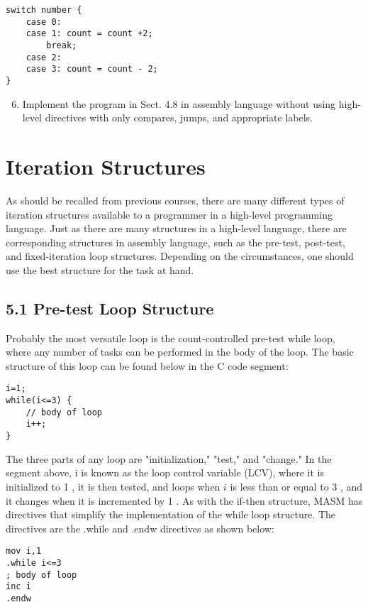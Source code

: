\documentclass[10pt]{article}
\begin{document}
\begin{verbatim}
switch number {
    case 0:
    case 1: count = count +2;
        break;
    case 2:
    case 3: count = count - 2;
}
\end{verbatim}

\begin{enumerate}
  \setcounter{enumi}{5}
  \item Implement the program in Sect. 4.8 in assembly language without using high-level directives with only compares, jumps, and appropriate labels.
\end{enumerate}

\section*{Iteration Structures}
As should be recalled from previous courses, there are many different types of iteration structures available to a programmer in a high-level programming language. Just as there are many structures in a high-level language, there are corresponding structures in assembly language, such as the pre-test, post-test, and fixed-iteration loop structures. Depending on the circumstances, one should use the best structure for the task at hand.

\subsection*{5.1 Pre-test Loop Structure}
Probably the most versatile loop is the count-controlled pre-test while loop, where any number of tasks can be performed in the body of the loop. The basic structure of this loop can be found below in the C code segment:

\begin{verbatim}
i=1;
while(i<=3) {
    // body of loop
    i++;
}
\end{verbatim}

The three parts of any loop are "initialization," "test," and "change." In the segment above, i is known as the loop control variable (LCV), where it is initialized to 1 , it is then tested, and loops when $i$ is less than or equal to 3 , and it changes when it is incremented by 1 . As with the if-then structure, MASM has directives that simplify the implementation of the while loop structure. The directives are the .while and .endw directives as shown below:

\begin{verbatim}
mov i,1
.while i<=3
; body of loop
inc i
.endw
\end{verbatim}
\end{document}
